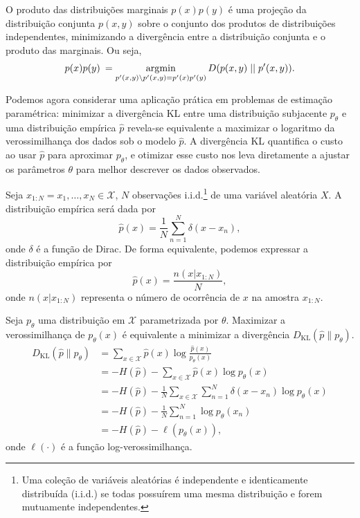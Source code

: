 O produto das distribuições marginais $p(x)p(y)$ é uma projeção da distribuição
conjunta $p(x,y)$ sobre o conjunto dos produtos de distribuições independentes,
minimizando a divergência entre a distribuição conjunta e o produto das marginais.
Ou seja,
\begin{equation}
p(x)p(y) \: = \operatorname*{\arg\!\min}_{p'(x,y) \backslash p'(x,y)=p'(x)p'(y)} D(p(x,y) \mid\mid p'(x,y)) .
\end{equation}


Podemos agora considerar uma aplicação prática em problemas de estimação paramétrica:
minimizar a divergência KL entre uma distribuição subjacente $p_\theta$ e uma distribuição empírica $\hat{p}$
revela-se equivalente a maximizar o logaritmo da verossimilhança dos dados sob o modelo $\hat{p}$.
A divergência KL quantifica o custo ao usar $\hat{p}$ para aproximar $p_\theta$, 
e otimizar esse custo nos leva diretamente a ajustar os parâmetros $\theta$ para melhor descrever os dados observados.

Seja $x_{1:N} = x_1, \ldots, x_N \in \mathcal{X}$, $N$ observações i.i.d.\footnote{Uma coleção de variáveis aleatórias é
independente e identicamente distribuída (i.i.d.) se todas possuírem uma mesma distribuição e forem mutuamente independentes.} 
de uma variável aleatória $X$. A distribuição empírica será dada por
\begin{equation}
\hat{p}(x) = \frac{1}{N} \sum_{n=1}^{N} \delta(x - x_n) ,
\end{equation}
onde $\delta$ é a função de Dirac. De forma equivalente, podemos expressar a distribuição empírica por
\begin{equation}
  \hat{p}(x) = \frac{n(x|x_{1:N})}{N} ,
\end{equation}
onde $n(x|x_{1:N})$ representa o número de ocorrência de $x$ na amostra $x_{1:N}$.


Seja $p_\theta$ uma distribuição em $\mathcal{X}$ parametrizada por $\theta$.
Maximizar a verossimilhança de $p_\theta(x)$ é equivalente a minimizar a divergência
$D_\mathrm{KL}(\hat{p} \parallel p_\theta)$.
\begin{subequations}\label{eq:dvmleext}
\begin{align}
  D_\mathrm{KL}(\hat{p} \parallel p_\theta) &= \sum_{x \in \mathcal{X}} \hat{p}(x) \log \frac{\hat{p}(x)}{p_\theta(x)} \\
        &= -H(\hat{p}) - \sum_{x \in \mathcal{X}} \hat{p}(x) \log p_\theta(x) \\
        &= -H(\hat{p}) - \frac{1}{N} \sum_{x \in \mathcal{X}} \sum_{n=1}^{N} \delta(x - x_n) \log p_\theta(x) \\
        &= -H(\hat{p}) - \frac{1}{N} \sum_{n=1}^{N} \log p_\theta(x_n) \\
	&= -H(\hat{p}) - \ell(p_\theta(x)) ,
\end{align}
\end{subequations}
onde $\ell(\cdot)$ é a função log-verossimilhança.


